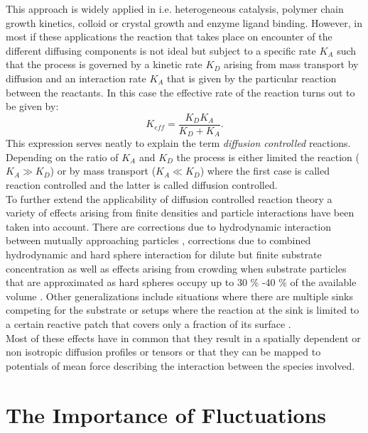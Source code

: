 This approach is widely applied in i.e. heterogeneous catalysis, polymer chain growth kinetics, colloid or crystal growth and enzyme ligand binding. However, in most if these applications the reaction that takes place on encounter of the different diffusing components is not ideal but subject to a specific rate $K_A$ such that the process is governed by a kinetic rate $K_D$ arising from mass transport by diffusion and an interaction rate $K_A$ that is given by the particular reaction between the reactants. In this case the effective rate of the reaction turns out to be given by:
\begin{equation}
    K_{eff} = \frac{K_D K_A}{K_D + K_A}.
    \label{KeffIntro}
\end{equation}
This expression serves neatly to explain the term \emph{diffusion controlled} reactions. Depending on the ratio of $K_A$ and $K_D$ the process is either limited the reaction ($K_A \gg K_D$) or by mass transport ($K_A \ll K_D$) where the first case is called reaction controlled and the latter is called diffusion controlled. \\

To further extend the applicability of diffusion controlled reaction theory a variety of effects arising from finite densities and particle interactions have been taken into account. There are corrections due to hydrodynamic interaction between mutually approaching particles \cite{Friedman1966, Wolyes1976}, corrections due to combined hydrodynamic and hard sphere interaction for dilute but finite substrate concentration \cite{Dzubiella2005} as well as effects arising from crowding when substrate particles that are approximated as hard spheres occupy up to 30 \% -40 \% of the available volume \cite{Dorsaz2010}. Other generalizations include situations where there are multiple sinks competing for the substrate \cite{Reck1968a, Reck1968b} or setups where the reaction at the sink is limited to a certain reactive patch that covers only a fraction of its surface \cite{schmitz1972role, schurr1976, shoup1981diffusion, shoup1982role}. \\
Most of these effects have in common that they result in a spatially dependent or non isotropic diffusion profiles or tensors  or that they can be mapped to potentials of mean force describing the interaction between the species involved.
\newpage
\section{The Importance of Fluctuations}

